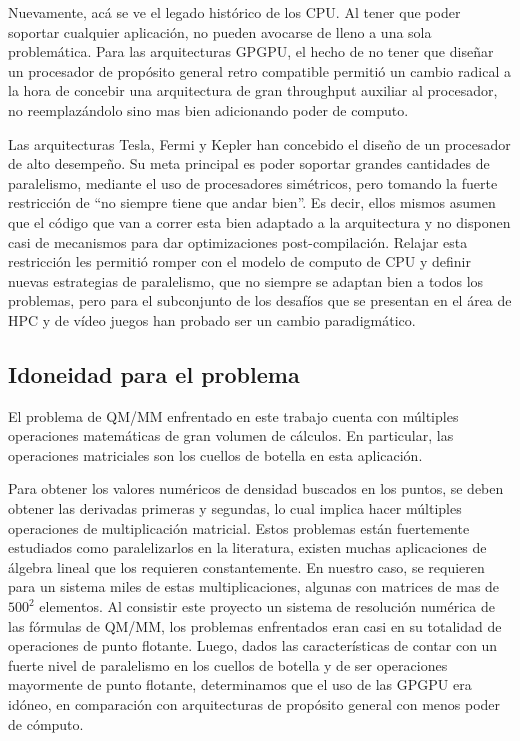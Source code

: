 Nuevamente, ac\'a se ve el legado hist\'orico de los CPU. Al tener que poder soportar cualquier aplicaci\'on, no pueden
avocarse de lleno a una sola problem\'atica. Para las arquitecturas GPGPU, el hecho de no tener que dise\~nar un
procesador de prop\'osito general retro compatible permiti\'o un cambio radical a la hora de concebir
una arquitectura de gran throughput auxiliar al procesador, no reemplaz\'andolo sino mas bien adicionando poder de computo.~\cite{GlaskowskyFermi}

Las arquitecturas Tesla, Fermi y Kepler han concebido el dise\~no de un procesador de alto desempe\~no.
Su meta principal es poder soportar grandes cantidades de paralelismo, mediante el uso de procesadores
sim\'etricos, pero tomando la fuerte restricci\'on de ``no siempre tiene que andar bien''. Es decir, ellos
mismos asumen que el c\'odigo que van a correr esta bien adaptado a la arquitectura y no disponen
casi de mecanismos para dar optimizaciones post-compilaci\'on. Relajar esta restricci\'on
les permiti\'o romper con el modelo de computo de CPU y definir nuevas estrategias de paralelismo,
que no siempre se adaptan bien a todos los problemas, pero para el subconjunto de los desaf\'ios que se
presentan en el \'area de HPC y de v\'ideo juegos han probado ser un cambio paradigm\'atico.

\subsection{Idoneidad para el problema}
El problema de QM/MM enfrentado en este trabajo cuenta con m\'ultiples operaciones matem\'aticas de gran
volumen de c\'alculos. En particular, las operaciones matriciales son los cuellos de botella en esta aplicaci\'on.

Para obtener los valores num\'ericos de densidad buscados en los puntos, se deben obtener las derivadas primeras
y segundas, lo cual implica hacer m\'ultiples operaciones de multiplicaci\'on matricial. Estos problemas est\'an
fuertemente estudiados como paralelizarlos en la literatura, existen muchas aplicaciones de \'algebra lineal que
los requieren constantemente.
En nuestro caso, se requieren para un sistema miles de estas multiplicaciones, algunas con matrices de mas de
$500^2$ elementos. Al consistir este proyecto un sistema de resoluci\'on num\'erica de las f\'ormulas de QM/MM,
los problemas enfrentados eran casi en su totalidad de operaciones de punto flotante. Luego, dados las
caracter\'isticas de contar con un fuerte nivel de paralelismo en los cuellos de botella y de ser operaciones
mayormente de punto flotante, determinamos que el uso de las GPGPU era id\'oneo, en comparaci\'on con arquitecturas
de prop\'osito general con menos poder de c\'omputo.


